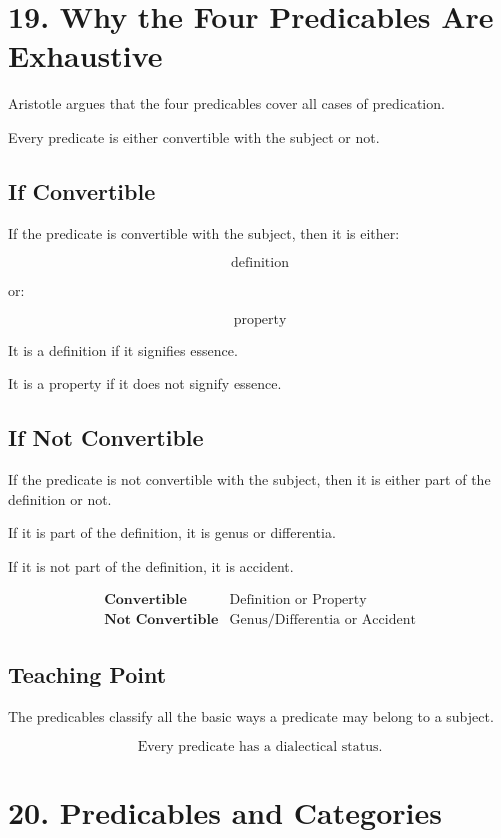 \documentclass[12pt]{article}
\begin{document}
\section*{19. Why the Four Predicables Are Exhaustive}

Aristotle argues that the four predicables cover all cases of predication.

Every predicate is either convertible with the subject or not.

\subsection*{If Convertible}

If the predicate is convertible with the subject, then it is either:

\[
\text{definition}
\]

or:

\[
\text{property}
\]

It is a definition if it signifies essence.

It is a property if it does not signify essence.

\subsection*{If Not Convertible}

If the predicate is not convertible with the subject, then it is either part of
the definition or not.

If it is part of the definition, it is genus or differentia.

If it is not part of the definition, it is accident.

\[
\begin{array}{c|c}
\textbf{Convertible} & \text{Definition or Property} \\
\hline
\textbf{Not Convertible} & \text{Genus/Differentia or Accident}
\end{array}
\]

\subsection*{Teaching Point}

The predicables classify all the basic ways a predicate may belong to a subject.

\[
\boxed{
\text{Every predicate has a dialectical status.}
}
\]

\section*{20. Predicables and Categories}
\end{document}
